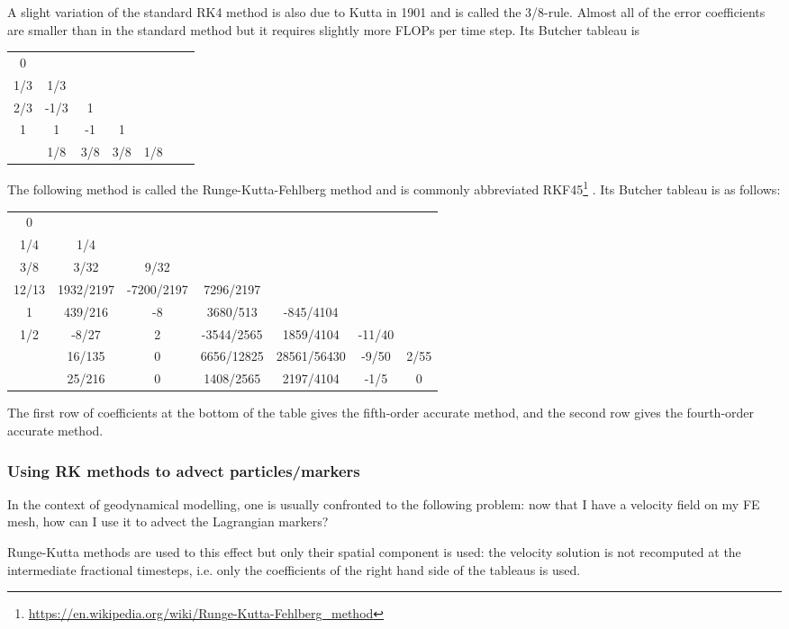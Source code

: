 A slight variation of the standard RK4 method is also due to Kutta in 1901 and is called the 3/8-rule. 
Almost all of the error coefficients are smaller than in the standard method but it requires slightly more FLOPs 
per time step. Its Butcher tableau is

\begin{tabular}{c|cccccc}
0 & \\
1/3 & 1/3 \\
2/3 & -1/3 & 1 \\
1 & 1 & -1 & 1 \\
\hline
 & 1/8 & 3/8 & 3/8 & 1/8 
\end{tabular}


 
The following method is called the Runge-Kutta-Fehlberg method and is 
commonly abbreviated 
RKF45\footnote{\url{https://en.wikipedia.org/wiki/Runge-Kutta-Fehlberg_method}}
. Its Butcher tableau is as follows: 

\begin{tabular}{c|cccccc}
0 & \\
1/4 	&1/4\\ 
3/8 	&3/32 		&9/32 \\
12/13 	&1932/2197 	&-7200/2197 &	7296/2197\\
1 	&439/216 	&-8 	&3680/513 &	-845/4104\\
1/2 	&-8/27 		&2 	&-3544/2565& 	1859/4104 &	-11/40 	\\
\hline
&16/135 	&0 		&6656/12825 	&28561/56430 	&-9/50& 	2/55\\
&25/216 	&0 	&1408/2565 	&2197/4104 	&-1/5 	&0 
\end{tabular}


The first row of coefficients at the bottom of the table gives the fifth-order accurate method, and the second row gives the fourth-order accurate method. 

\subsubsection{Using RK methods to advect particles/markers}

In the context of geodynamical modelling, one is usually confronted to the following problem:
now that I have a velocity field on my FE mesh, how can I use it to advect the Lagrangian 
markers?

Runge-Kutta methods are used to this effect but only their spatial component is used:
the velocity solution is not recomputed at the intermediate fractional timesteps, i.e. 
only the coefficients of the right hand side of the tableaus is used.

